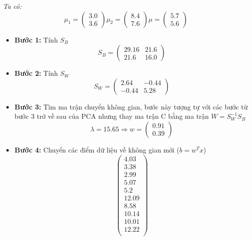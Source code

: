 \textit{Ta có:} 
$$
\mu_1 = \left( \begin{array}{c}
	3.0 \\
	3.6
\end{array} \right)
%
\mu_2 = \left( \begin{array}{c}
	8.4 \\
	7.6	
\end{array} \right)
\mu = \left( \begin{array}{c}
	5.7 \\
	5.6	
\end{array} \right)
$$

\begin{itemize}
	\item \textbf{Bước 1:} Tính $S_B$
	$$
		S_B = \left( \begin{array}{cc}
			29.16 & 21.6\\
			21.6 & 16.0
		\end{array}\right)
	$$
	\item \textbf{Bước 2:} Tính $S_W$
	$$
		S_W = \left( \begin{array}{cc}
			2.64 & -0.44\\
			-0.44 & 5.28
		\end{array}\right)
	$$
	\item \textbf{Bước 3:} Tìm ma trận chuyển không gian, bước này tượng tự với các bước từ bước 3 trở về sau của PCA nhưng thay ma trận C bằng ma trận $W = S_W^{-1}S_B$
	$$
		\lambda = 15.65 
		\Longrightarrow w = \left( \begin{array}{c}
			0.91\\
			0.39
		\end{array}\right)
	$$
	\item \textbf{Bước 4:} Chuyển các điểm dữ liệu về không gian mới ($b = w^Tx$)
	$$
		\left( \begin{array}{c}
			4.03 \\
			3.38 \\
			2.99 \\
			5.07 \\
			5.2 \\
			12.09 \\
			8.58 \\
			10.14 \\
			10.01 \\
			12.22 \\
		\end{array} \right)
	$$
\end{itemize}
\pagebreak

